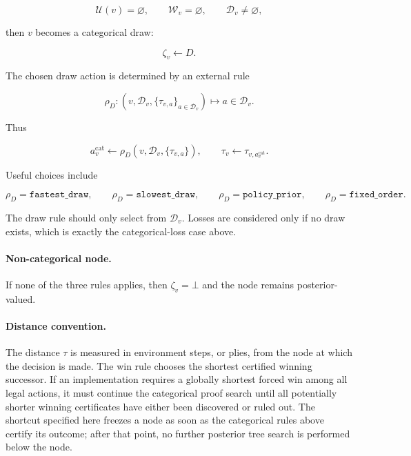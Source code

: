 \documentclass[11pt]{article}
\newcommand{\Unresolved}{\mathcal{U}}
\begin{document}
\[
\Unresolved(v)=\varnothing,
\qquad
\mathcal{W}_v=\varnothing,
\qquad
\mathcal{D}_v\ne\varnothing,
\]

then \(v\) becomes a categorical draw:

\[
\zeta_v\gets D.
\]

The chosen draw action is determined by an external rule

\[
\rho_D:
(v,\mathcal{D}_v,\{\tau_{v,a}\}_{a\in\mathcal{D}_v})
\mapsto a\in\mathcal{D}_v.
\]

Thus

\[
a_v^{\mathrm{cat}}\gets\rho_D(v,\mathcal{D}_v,\{\tau_{v,a}\}),
\qquad
\tau_v\gets\tau_{v,a_v^{\mathrm{cat}}}.
\]

Useful choices include

\[
\rho_D=\texttt{fastest\_draw},
\qquad
\rho_D=\texttt{slowest\_draw},
\qquad
\rho_D=\texttt{policy\_prior},
\qquad
\rho_D=\texttt{fixed\_order}.
\]

The draw rule should only select from \(\mathcal{D}_v\). Losses are considered
only if no draw exists, which is exactly the categorical-loss case above.

\paragraph{Non-categorical node.}
If none of the three rules applies, then \(\zeta_v=\bot\) and the node remains
posterior-valued.

\paragraph{Distance convention.}
The distance \(\tau\) is measured in environment steps, or plies, from the node
at which the decision is made. The win rule chooses the shortest certified
winning successor. If an implementation requires a globally shortest forced win
among all legal actions, it must continue the categorical proof search until all
potentially shorter winning certificates have either been discovered or ruled
out. The shortcut specified here freezes a node as soon as the categorical rules
above certify its outcome; after that point, no further posterior tree search is
performed below the node.
\end{document}
